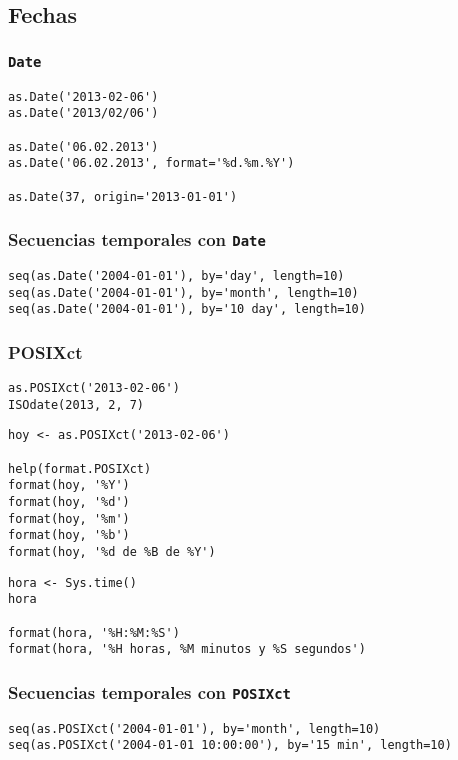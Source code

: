 \documentclass[xcolor={usenames,svgnames,dvipsnames}]{beamer}
\begin{document}
\subsection{Fechas}
\label{sec-5-2}
\begin{frame}[fragile]
\frametitle{\texttt{Date}}
\label{sec-5-2-1}


\lstset{language=R}
\begin{lstlisting}
as.Date('2013-02-06')
as.Date('2013/02/06')

as.Date('06.02.2013')
as.Date('06.02.2013', format='%d.%m.%Y')

as.Date(37, origin='2013-01-01')
\end{lstlisting}
\end{frame}
\begin{frame}[fragile]
\frametitle{Secuencias temporales con \texttt{Date}}
\label{sec-5-2-2}


\lstset{language=R}
\begin{lstlisting}
seq(as.Date('2004-01-01'), by='day', length=10)
seq(as.Date('2004-01-01'), by='month', length=10)
seq(as.Date('2004-01-01'), by='10 day', length=10)
\end{lstlisting}
\end{frame}
\begin{frame}[fragile]
\frametitle{POSIXct}
\label{sec-5-2-3}


\lstset{language=R}
\begin{lstlisting}
as.POSIXct('2013-02-06')
ISOdate(2013, 2, 7)
\end{lstlisting}


\lstset{language=R}
\begin{lstlisting}
hoy <- as.POSIXct('2013-02-06')

help(format.POSIXct)
format(hoy, '%Y')
format(hoy, '%d')
format(hoy, '%m')
format(hoy, '%b')
format(hoy, '%d de %B de %Y')
\end{lstlisting}


\lstset{language=R}
\begin{lstlisting}
hora <- Sys.time()
hora

format(hora, '%H:%M:%S')
format(hora, '%H horas, %M minutos y %S segundos')
\end{lstlisting}
\end{frame}
\begin{frame}[fragile]
\frametitle{Secuencias temporales con \texttt{POSIXct}}
\label{sec-5-2-4}


\lstset{language=R}
\begin{lstlisting}
seq(as.POSIXct('2004-01-01'), by='month', length=10)
seq(as.POSIXct('2004-01-01 10:00:00'), by='15 min', length=10)
\end{lstlisting}
\end{frame}
\end{document}
